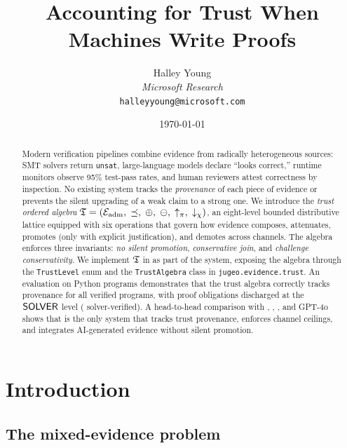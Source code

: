 \documentclass[11pt]{article}
\title{\textbf{Accounting for Trust When Machines Write Proofs}}
\author{%
  Halley Young\\
  \textit{Microsoft Research}\\
  \texttt{halleyyoung@microsoft.com}
}
\date{\today}
\begin{document}
\maketitle

\begin{abstract}
Modern verification pipelines combine evidence from radically
heterogeneous sources: SMT solvers return \texttt{unsat},
large-language models declare ``looks correct,'' runtime monitors
observe 95\% test-pass rates, and human reviewers attest
correctness by inspection.
No existing system tracks the \emph{provenance} of each piece
of evidence or prevents the silent upgrading of a weak claim
to a strong one.
We introduce the \emph{trust ordered algebra}
$\mathfrak{T} = (\mathcal{E}_{\mathrm{adm}},\;\preceq,\;\oplus,\;\ominus,\;\uparrow_\pi,\;\downarrow_\chi)$,
an eight-level bounded distributive lattice equipped with
six operations that govern how evidence composes, attenuates,
promotes (only with explicit justification), and demotes across
channels.
The algebra enforces three invariants:
\emph{no silent promotion},
\emph{conservative join}, and
\emph{challenge conservativity}.
We implement $\mathfrak{T}$ in \Python{} as part of the \JuGeo{} system,
exposing the algebra through the \texttt{TrustLevel} enum
and the \texttt{TrustAlgebra} class in
\texttt{jugeo.evidence.trust}.
An evaluation on \compTotalPrograms{} Python programs demonstrates
that the trust algebra correctly tracks provenance for all
\compTotalVerified{} verified programs, with \compTrustSolverdischarged{}
proof obligations discharged at the $\mathsf{SOLVER}$ level
(\compTrustSolverdischargedPct{} solver-verified).
A head-to-head comparison with \LEAN{}, \Fstar{}, \Dafny{},
and GPT-4o shows that \JuGeo{} is the only system that
tracks trust provenance, enforces channel ceilings,
and integrates AI-generated evidence without silent promotion.
\end{abstract}

\newpage

\section{Introduction}\label{sec:intro}

\subsection{The mixed-evidence problem}
\end{document}
